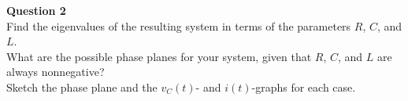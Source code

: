 \documentclass[preview]{standalone}
\begin{document}
\begin{center}
\textbf{Question 2} \\[10pt]
            Find the eigenvalues of the resulting system in terms of 
            the parameters $R$, $C$, and $L$. \\[5pt]
            What are the possible phase planes for your system, given that 
            $R$, $C$, and $L$ are always nonnegative? \\[5pt]
            Sketch the phase plane and the $v_C(t)$- and $i(t)$-graphs for each case.
\end{center}
\end{document}

